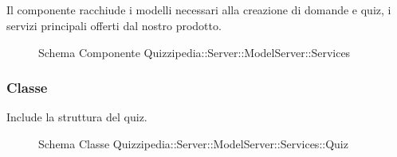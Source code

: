 \subsection{}
Il componente racchiude i modelli necessari alla creazione di domande e quiz, i servizi principali offerti dal nostro prodotto.
\begin{figure}[H]
\centering
\noindent{}
\caption[Schema Componente Quizzipedia::Server::ModelServer::Services]{Schema Componente Quizzipedia::Server::ModelServer::Services}
\end{figure}
\subsubsection{Classe }
Include la struttura del quiz.
\begin{figure}[H]
\centering
\noindent{}
\caption[Schema Classe Quiz]{Schema Classe Quizzipedia::Server::ModelServer::Services::Quiz}
\end{figure}
